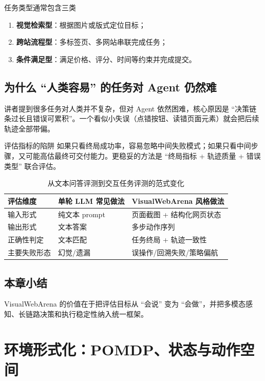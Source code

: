 \documentclass[a4paper]{article}
\begin{document}
\begin{knowledgebox}{任务类型通常包含三类}
\begin{enumerate}
    \item \textbf{视觉检索型}：根据图片或版式定位目标；
    \item \textbf{跨站流程型}：多标签页、多网站串联完成任务；
    \item \textbf{条件满足型}：满足价格、评分、时间等约束并完成提交。
\end{enumerate}
\end{knowledgebox}

\subsection{为什么 ``人类容易'' 的任务对 Agent 仍然难}
讲者提到很多任务对人类并不复杂，但对 Agent 依然困难，核心原因是 ``决策链条过长且错误可累积''。一个看似小失误（点错按钮、读错页面元素）就会把后续轨迹全部带偏。

\begin{warningbox}{评估指标的陷阱}
如果只看终局成功率，容易忽略中间失败模式；如果只看中间步骤，又可能高估最终可交付能力。更稳妥的方法是 ``终局指标 + 轨迹质量 + 错误类型'' 联合评估。
\end{warningbox}

\begin{table}[H]
\centering
\small
\begin{tabular}{p{2.8cm}p{4.0cm}p{4.2cm}}
\toprule
\textbf{评估维度} & \textbf{单轮 LLM 常见做法} & \textbf{VisualWebArena 风格做法} \\
\midrule
输入形式 & 纯文本 prompt & 页面截图 + 结构化网页状态 \\
输出形式 & 文本答案 & 多步动作序列 \\
正确性判定 & 文本匹配 & 任务终局 + 轨迹一致性 \\
主要失败形态 & 幻觉/遗漏 & 误操作/回溯失败/策略偏航 \\
\bottomrule
\end{tabular}
\caption{从文本问答评测到交互任务评测的范式变化}
\end{table}

\subsection{本章小结}
VisualWebArena 的价值在于把评估目标从 ``会说'' 变为 ``会做''，并把多模态感知、长链路决策和执行稳定性纳入统一框架。

\section{环境形式化：POMDP、状态与动作空间}
\end{document}
